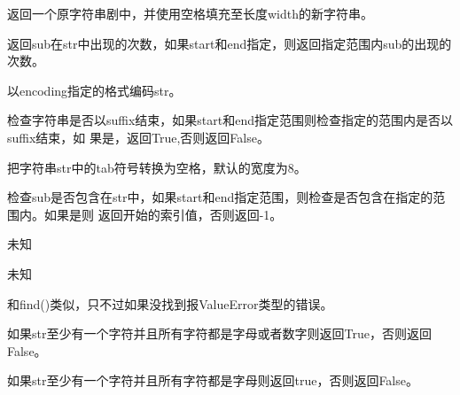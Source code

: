\noindent{\color{red}{str.center(width[, fillchar]):}}
\par{返回一个原字符串剧中，并使用空格填充至长度width的新字符串。}\\

\noindent{\color{red}{str.count(sub[, start[, end]]):}}
\par{返回sub在str中出现的次数，如果start和end指定，则返回指定范围内sub的出现的次数。}\\

\par{以encoding指定的格式编码str。}\\

\noindent{\color{red}{str.endswith(suffix[, start[, end]]):}}
\par{检查字符串是否以suffix结束，如果start和end指定范围则检查指定的范围内是否以suffix结束，如
果是，返回True,否则返回False。}\\

\noindent{\color{red}{str.expandtabs(tabsize=8):}}
\par{把字符串str中的tab符号转换为空格，默认的宽度为8。}\\

\noindent{\color{red}{str.find(sub[, start[, end]]):}}
\par{检查sub是否包含在str中，如果start和end指定范围，则检查是否包含在指定的范围内。如果是则
返回开始的索引值，否则返回-1。}\\

\noindent{\color{red}{str.format(*args, **kwargs):}}
\par{未知}\\

\noindent{\color{red}{str.format\_map(mapping):}}
\par{未知}\\

\noindent{\color{red}{str.index(sub[, start[, end]]):}}
\par{和find()类似，只不过如果没找到报ValueError类型的错误。}\\

\noindent{\color{red}{str.isalnum():}}
\par{如果str至少有一个字符并且所有字符都是字母或者数字则返回True，否则返回False。}\\

\noindent{\color{red}{str.isalpha():}}
\par{如果str至少有一个字符并且所有字符都是字母则返回true，否则返回False。}\\

